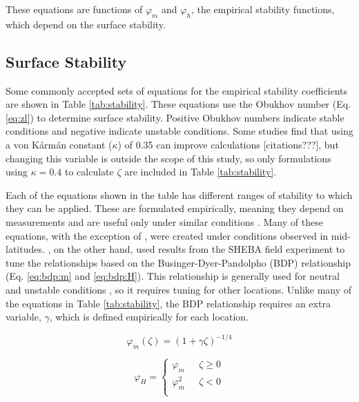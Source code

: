 These equations are functions of $\varphi_{m}$ and $\varphi_{h}$, the empirical stability functions, which depend on the surface stability. 

\subsection{Surface Stability}

Some commonly accepted sets of equations for the empirical stability coefficients are shown in Table \ref{tab:stability}. These equations use the Obukhov number (Eq. \ref{eq:zl}) to determine surface stability. Positive Obukhov numbers indicate stable conditions and negative indicate unstable conditions. Some studies find that using a von K\'{a}rm\'{a}n constant ($\kappa$) of 0.35 can improve calculations [citations???], but changing this variable is outside the scope of this study, so only formulations using $\kappa = 0.4$ to calculate $\zeta$ are included in Table \ref{tab:stability}. 

Each of the equations shown in the table has different ranges of stability to which they can be applied. These are formulated empirically, meaning they depend on measurements and are useful only under similar conditions \citep{stull:1988} \citep{foken:2008}. Many of these equations, with the exception of \citet{andreas:2010}, were created under conditions observed in mid-latitudes. \citet{andreas:2010}, on the other hand, used results from the SHEBA field experiment to tune the relationships based on the Businger-Dyer-Pandolpho (BDP) relationship (Eq. \ref{eq:bdp:m} and \ref{eq:bdp:H}). This relationship is generally used for neutral and unstable conditions \citep{foken:2008}, so it requires tuning for other locations. Unlike many of the equations in Table \ref{tab:stability}, the BDP relationship requires an extra variable, $\gamma$, which is defined empirically for each location.

\begin{equation}\label{eq:bdp:m}
\varphi_{m}(\zeta) = (1 + \gamma \zeta)^{-1/4}
\end{equation}

\begin{equation}\label{eq:bdp:H}
\varphi_{H} = \begin{cases} 
\varphi_{m} & \text{    } \zeta \geq 0 \\ 
\varphi_{m}^{2} & \text{    } \zeta < 0 \\ 
\end{cases}
\end{equation}

